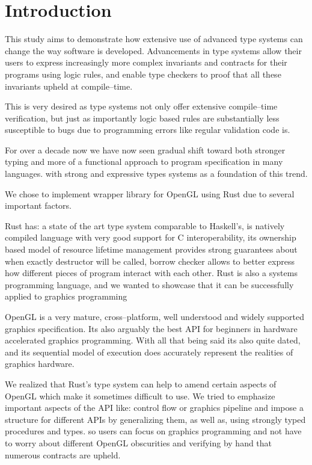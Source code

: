 \chapter*{Introduction}

This study aims to demonstrate how extensive use of advanced type systems can change the way software is developed.
Advancements in type systems allow their users to express increasingly more complex invariants and contracts for their programs using logic rules, 
and enable type checkers to proof that all these invariants upheld at compile--time.

This is very desired as type systems not only offer extensive compile--time verification, but just as importantly logic based rules are substantially less susceptible to bugs
due to programming errors like regular validation code is.

For over a decade now we have now seen gradual shift toward both stronger typing and more of a functional approach to program specification in many languages.
with strong and expressive types systems as a foundation of this trend.

We chose to implement wrapper library for OpenGL using Rust due to several important factors.

Rust has: a state of the art type system comparable to Haskell's, 
is natively compiled language with very good support for C interoperability,
its ownership based model of resource lifetime management provides strong guarantees about when exactly destructor will be called,
borrow checker allows to better express how different pieces of program interact with each other.
Rust is also a systems programming language, and we wanted to showcase that it can be successfully applied to graphics programming \cite{rustpage}

OpenGL is a very mature, cross--platform, well understood and widely supported graphics specification.
Its also arguably the best API for beginners in hardware accelerated graphics programming.
With all that being said its also quite dated, and its sequential model of execution does accurately represent the realities of graphics hardware.

We realized that Rust's type system can help to amend certain aspects of OpenGL which make it sometimes difficult to use.
We tried to emphasize important aspects of the API like: control flow or graphics pipeline and 
impose a structure for different APIs by generalizing them, as well as, using strongly typed procedures and types.
so users can focus on graphics programming and not have to worry about different OpenGL obscurities and verifying by hand that 
numerous contracts are upheld.

